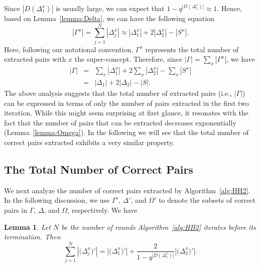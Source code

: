 \documentclass[10pt,journal,cspaper,compsoc]{IEEEtran}
\newtheorem{lemma}{Lemma}
\begin{document}
Since $|D(\Delta_1^x)|$ is usually large, we can expect that $1-q^{|D(\Delta_1^x)|}\approx 1$. Hence, based on Lemma~\ref{lemma:Delta}, we can have the following equation
\begin{equation}
|\Gamma^x|=\sum_{j=1}^{N}|\Delta_j^x|\approx|\Delta_1^x| + 2|\Delta_2^x|-|S^x|.
\end{equation}
Here, following our notational convention, $\Gamma^x$ represents the total number of extracted pairs with $x$ the super-concept. 
Therefore, since $|\Gamma|=\sum_{x}|\Gamma^x|$, we have
\begin{eqnarray}
|\Gamma|&=&\sum_x|\Delta_1^x| + 2\sum_x|\Delta_2^x|-\sum_x|S^x|\\\nonumber
&=&|\Delta_1|+2|\Delta_2|-|S|.
\end{eqnarray}
The above analysis suggests that the total number of extracted pairs (i.e., $|\Gamma|$) can be expressed in terms of only the number of pairs extracted in the first two iteration. While this might seem surprising at first glance, it resonates with the fact that the number of pairs that can be extracted decreases exponentially (Lemma~\ref{lemma:Omega}). In the following we will see that the total number of correct pairs extracted exhibits a very similar property.

\subsection{The Total Number of Correct Pairs}

We next analyze the number of correct pairs extracted by Algorithm~\ref{alg:HH2}. In the following discussion, we use $\Gamma'$, $\Delta'$, and $\Omega'$ to denote the subsets of correct pairs in $\Gamma$, $\Delta$, and $\Omega$, respectively. We have 
\begin{lemma}\label{lemma:Delta2}
Let $N$ be the number of rounds Algorithm~\ref{alg:HH2} iterates before its termination. Then
\begin{equation}
\sum_{j=1}^{N}|\big(\Delta_j^x\big)'|=|\big(\Delta_1^x\big)'| + \frac{2}{1-q^{|D(\Delta_1^x)|}}|\big(\Delta_2^x\big)'|.
\end{equation}
\end{lemma}
\end{document}
